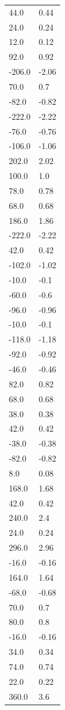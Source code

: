 \begin{longtable}{ll}
44.0 & 0.44 \\
24.0 & 0.24 \\
12.0 & 0.12 \\
92.0 & 0.92 \\
-206.0 & -2.06 \\
70.0 & 0.7 \\
-82.0 & -0.82 \\
-222.0 & -2.22 \\
-76.0 & -0.76 \\
-106.0 & -1.06 \\
202.0 & 2.02 \\
100.0 & 1.0 \\
78.0 & 0.78 \\
68.0 & 0.68 \\
186.0 & 1.86 \\
-222.0 & -2.22 \\
42.0 & 0.42 \\
-102.0 & -1.02 \\
-10.0 & -0.1 \\
-60.0 & -0.6 \\
-96.0 & -0.96 \\
-10.0 & -0.1 \\
-118.0 & -1.18 \\
-92.0 & -0.92 \\
-46.0 & -0.46 \\
82.0 & 0.82 \\
68.0 & 0.68 \\
38.0 & 0.38 \\
42.0 & 0.42 \\
-38.0 & -0.38 \\
-82.0 & -0.82 \\
8.0 & 0.08 \\
168.0 & 1.68 \\
42.0 & 0.42 \\
240.0 & 2.4 \\
24.0 & 0.24 \\
296.0 & 2.96 \\
-16.0 & -0.16 \\
164.0 & 1.64 \\
-68.0 & -0.68 \\
70.0 & 0.7 \\
80.0 & 0.8 \\
-16.0 & -0.16 \\
34.0 & 0.34 \\
74.0 & 0.74 \\
22.0 & 0.22 \\
360.0 & 3.6 \\

\end{longtable}
